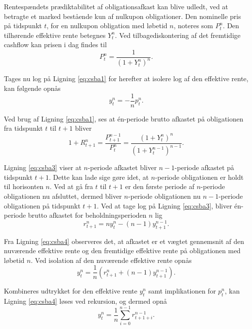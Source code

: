 \documentclass[
  a4paper,
  oneside]{memoir}
\begin{document}
Rentespændets prædiktabilitet af obligationsafkast kan blive udledt, ved at betragte et marked bestående kun af nulkupon obligationer. Den nominelle pris på tidspunkt \(t\), for en nulkupon obligation med løbetid \(n\), noteres som \(P_t^n\). Den tilhørende effektive rente betegnes \(Y_t^n\). Ved tilbagediskontering af det fremtidige cashflow kan prisen i dag findes til
\begin{equation}
P_t^n=\frac{1}{(1+Y_t^n)^n}. \label{eq:csba1}
\end{equation}

Tages nu log på Ligning \eqref{eq:csba1} for herefter at isolere log af den effektive rente, kan følgende opnås
\begin{equation}
y_t^n=-\frac{1}{n}p_t^n. \label{eq:csba2}
\end{equation}

Ved brug af Ligning \eqref{eq:csba1}, ses at én-periode brutto afkastet på obligationen fra tidspunkt \(t\) til \(t+1\) bliver
\begin{equation}
1+R_{t+1}^n=\frac{P_{t+1}^{n-1}}{P_t^n}=\frac{(1+Y_t^n)^n}{(1+Y_t^{n-1})^{n-1}}. \label{eq:csba3}
\end{equation}

Ligning \eqref{eq:csba3} viser at \(n\)-periode afkastet bliver \(n-1\)-periode afkastet på tidspunkt \(t+1\). Dette kan lade sige gøre idet, at \(n\)-periode obligationen er holdt til horisonten \(n\). Ved at gå fra \(t\) til \(t+1\) er den første periode af \(n\)-periode obligationen nu afsluttet, dermed bliver \(n\)-periode obligationen nu \(n-1\)-periode obligationen på tidspunkt \(t+1\). Ved at tage log på Ligning \eqref{eq:csba3}, bliver én-periode brutto afkastet for beholdningsperioden \(n\) lig
\begin{equation}
r_{t+1}^n=n y_t^n - (n-1) y_{t+1}^{n-1}. \label{eq:csba4}
\end{equation}

Fra Ligning \eqref{eq:csba4} observeres det, at afkastet er et vægtet gennemsnit af den nuværende effektive rente og den fremtidige effektive rente på obligationen med løbetid \(n\). Ved isolation af den nuværende effektive rente opnås
\begin{equation}
y_t^n = \frac{1}{n} \left(r_{t+1}^n + (n-1) y_{t+1}^{n-1}\right). \label{eq:csba5}
\end{equation}

Kombineres udtrykket for den effektive rente \(y_t^n\) samt implikationen for \(p_t^n\), kan Ligning \eqref{eq:csba4} løses ved rekursion, og dermed opnå
\begin{equation}
y_t^n = \frac{1}{n} \sum_{i=0}^{n-1} r_{t+1+i}^{n-1}. \label{eq:csba6}
\end{equation}
\end{document}
